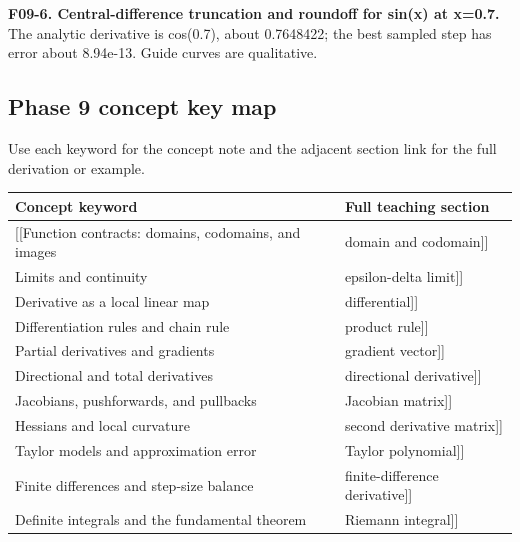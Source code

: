 \textbf{F09-6. Central-difference truncation and roundoff for sin(x) at x=0.7.} The analytic derivative is cos(0.7), about 0.7648422; the best sampled step has error about 8.94e-13. Guide curves are qualitative.

\subsection{Phase 9 concept key map}\label{appendix-adf48f5dc5c1-phase-9-concept-key-map}

Use each keyword for the concept note and the adjacent section link for the full derivation or example.

{\def\LTcaptype{none} %
\begin{longtable}[]{@{}
  >{\raggedright\arraybackslash}p{}
  >{\raggedright\arraybackslash}p{}@{}}
\toprule\noalign{}
\begin{minipage}[b]{\linewidth}\raggedright
Concept keyword
\end{minipage} & \begin{minipage}[b]{\linewidth}\raggedright
Full teaching section
\end{minipage} \\
\midrule\noalign{}
\endhead
\bottomrule\noalign{}
\endlastfoot
{[}{[}Function contracts: domains, codomains, and images & domain and codomain{]}{]} \\
{[}{[}Limits and continuity & epsilon-delta limit{]}{]} \\
{[}{[}Derivative as a local linear map & differential{]}{]} \\
{[}{[}Differentiation rules and chain rule & product rule{]}{]} \\
{[}{[}Partial derivatives and gradients & gradient vector{]}{]} \\
{[}{[}Directional and total derivatives & directional derivative{]}{]} \\
{[}{[}Jacobians, pushforwards, and pullbacks & Jacobian matrix{]}{]} \\
{[}{[}Hessians and local curvature & second derivative matrix{]}{]} \\
{[}{[}Taylor models and approximation error & Taylor polynomial{]}{]} \\
{[}{[}Finite differences and step-size balance & finite-difference derivative{]}{]} \\
{[}{[}Definite integrals and the fundamental theorem & Riemann integral{]}{]} \\

\end{longtable}}
